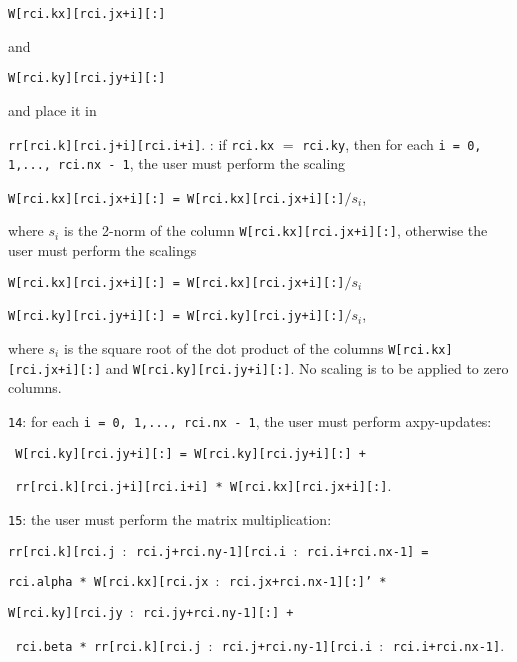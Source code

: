 \begin{description}
\begin{description}
\hspace{8mm}
{\tt W[rci.kx][rci.jx+i][:]} 

and

\hspace{8mm}
{\tt W[rci.ky][rci.jy+i][:]}

and place it in 

\hspace{8mm}
{\tt rr[rci.k][rci.j+i][rci.i+i]}.
%
: 
if {\tt rci.kx} $=$ {\tt rci.ky}, then
for each
{\tt i = 0, 1,..., rci.nx - 1}, 
the user must perform the scaling

\hspace{8mm}
{\tt W[rci.kx][rci.jx+i][:] = W[rci.kx][rci.jx+i][:]$/s_i$},

where $s_i$ is the 2-norm of the column 
{\tt W[rci.kx][rci.jx+i][:]},
otherwise the user must perform the scalings

\hspace{8mm}
{\tt W[rci.kx][rci.jx+i][:] = W[rci.kx][rci.jx+i][:]$/s_i$}

\hspace{8mm}
{\tt W[rci.ky][rci.jy+i][:] = W[rci.ky][rci.jy+i][:]$/s_i$},

where $s_i$ is the square root of the dot product of 
the columns 
{\tt W[rci.kx][rci.jx+i][:]} and
{\tt W[rci.ky][rci.jy+i][:]}.
No scaling is to be applied to zero columns.
%
\item
{\tt 14}: 
for each {\tt i = 0, 1,..., rci.nx - 1}, 
the user must perform axpy-updates:

\hspace{8mm}
{\tt 
W[rci.ky][rci.jy+i][:] = 
W[rci.ky][rci.jy+i][:] + 
}

\hspace{12mm}
{\tt
rr[rci.k][rci.j+i][rci.i+i] * W[rci.kx][rci.jx+i][:]}.
%
\item
{\tt 15}: the user must perform the matrix multiplication:

\hspace{8mm}
{\tt rr[rci.k][rci.j $:$ rci.j+rci.ny-1][rci.i $:$ rci.i+rci.nx-1] =}

\hspace{12mm}
{\tt rci.alpha *
   W[rci.kx][rci.jx $:$ rci.jx+rci.nx-1][:]' *}

\hspace{16mm}
{\tt W[rci.ky][rci.jy $:$ rci.jy+rci.ny-1][:] +}

\hspace{12mm}
{\tt 
rci.beta *
rr[rci.k][rci.j $:$ rci.j+rci.ny-1][rci.i $:$ rci.i+rci.nx-1]}.


\end{description}
\end{description}
